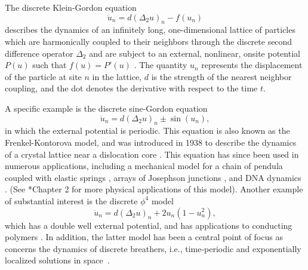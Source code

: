 \documentclass[12pt,reqno]{amsart}
\begin{document}
The discrete Klein-Gordon equation
\begin{equation*}
\ddot{u}_n = d (\Delta_2 u)_n - f(u_n)
\end{equation*}
describes the dynamics of an infinitely long, one-dimensional lattice of particles which are harmonically coupled to their neighbors through the discrete second difference operator $\Delta_2$ and are subject to an external, nonlinear, onsite potential $P(u)$ such that $f(u) = P'(u)$ \cite{Karachalios}. The quantity $u_n$ represents the displacement of the particle at site $n$ in the lattice, $d$ is the strength of the nearest neighbor coupling, and the dot denotes the derivative with respect to the time $t$. 

A specific example is the discrete sine-Gordon equation
\begin{equation}\label{eq:dSG}
	\ddot{u}_n = d (\Delta_2 u)_n \pm \sin(u_n),
\end{equation}
in which the external potential is periodic. This equation is also known as the Frenkel-Kontorova model, and was introduced in 1938 to describe the dynamics of a crystal lattice near a dislocation core \cites{braun1998,braun2004}. This equation has since been used in numerous applications, including a mechanical model for a chain of pendula coupled with elastic springs \cites{Scott1969,english}, arrays of Josephson junctions \cites{Ustinov1992,Floria1998}, and DNA dynamics \cites{Yomosa1983,Yakushevich1998,DeLeo2011}. (See \cite{braun2004}*{Chapter 2} for more physical applications of this model). Another example of  substantial interest is the discrete $\phi^4$ model
\begin{equation}\label{eq:dphi4}
	\ddot{u}_n = d (\Delta_2 u)_n + 2 u_n(1 - u_n^2),
\end{equation}
which has a double well external potential, and has applications to conducting polymers \cite{heeger1988}. In addition, the
latter model has been a central point of focus
as concerns the dynamics of discrete 
breathers, i.e., time-periodic and exponentially localized solutions in space~\cites{tsironis,FLACH20081}.
\end{document}
